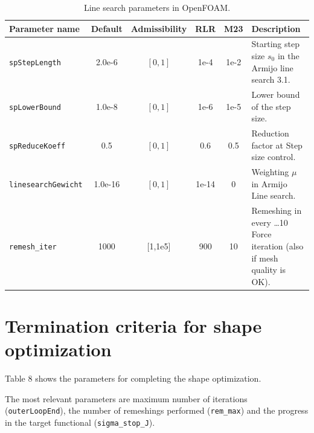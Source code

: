\documentclass[a4paper,oneside]{book}
\numberwithin{equation}{section}
\begin{document}
\begin{table}
    \begin{tabular}{|l|c|c|c|c|p{7.5cm}|}
        \hline 
        \cellcolor{light-gray}\textbf{Parameter name} & \cellcolor{light-gray}\textbf{Default} & \cellcolor{light-gray}\textbf{Admissibility} & \cellcolor{light-gray}\textbf{RLR} & \cellcolor{light-gray}\textbf{M23} & \cellcolor{light-gray}\textbf{Description} \\ 
        \hline 
        \texttt{spStepLength} & 2.0e-6 & $\left[0,1\right]$ & 1e-4 & 1e-2 & Starting step size $s_0$ in the
        Armijo line search 3.1. \\ 
        \hline 
        \texttt{spLowerBound} & 1.0e-8 & $\left[0,1\right]$ & 1e-6 & 1e-5 & Lower bound of the step size. \\ 
        \hline 
        \texttt{spReduceKoeff} & 0.5 & $\left[0,1\right]$ & 0.6 & 0.5 & Reduction factor at Step size control. \\ 
        \hline 
        \texttt{linesearchGewicht} & 1.0e-16 & $\left[0,1\right]$ & 1e-14 & 0 & Weighting $\mu$ in Armijo Line search. \\ 
        \hline 
        \verb|remesh_iter| & 1000 & [1,1e5] & 900 & 10 & Remeshing in every \ldots 10 Force iteration (also if mesh quality is OK). \\ 
        \hline 
    \end{tabular} 
    \caption{Line search parameters in OpenFOAM.}
\end{table}

\section{Termination criteria for shape optimization}
Table 8 shows the parameters for completing the shape optimization.

The most relevant parameters are maximum number of iterations (\texttt{outerLoopEnd}), the number of remeshings performed (\verb|rem_max|) and the progress in the target functional (\verb|sigma_stop_J|).
\end{document}
